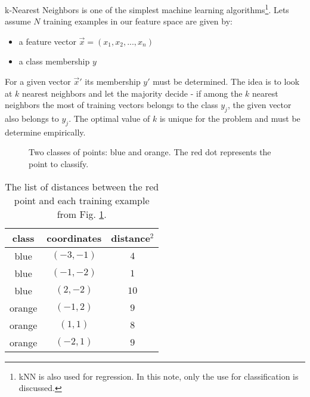 k-Nearest Neighbors is one of the simplest machine learning algorithms\footnote{kNN is also used for regression. In this note, only the use for classification is discussed.}. Lets assume $N$ training examples in our feature space are given by:

\begin{itemize}
  \item a feature vector $\vec x = (x_1, x_2, ... , x_n)$
  \item a class membership $y$
\end{itemize}

For a given vector $\vec x'$ its membership $y'$ must be determined. The idea is to look at $k$ nearest neighbors and let the majority decide - if among the $k$ nearest neighbors the most of training vectors belongs to the class $y_j$, the given vector also belongs to $y_j$. The optimal value of $k$ is unique for the problem and must be determine empirically. 

\begin{figure}

  \centering
  \caption{Two classes of points: blue and orange. The red dot represents the point to classify.}
  \label{fig: knnExample}
  
\end{figure}

\begin{table}
\begin{center}
\begin{tabular}{c | c | c}

class & coordinates & distance$^2$ \\ \hline
\color{mblue}blue     & $(-3,-1)$ & $4$  \\
\color{mblue}blue     & $(-1,-2)$ & $1$  \\
\color{mblue}blue     & $(2,-2)$  & $10$ \\ \hline
\color{morange}orange & $(-1,2)$  & $9$  \\
\color{morange}orange & $(1,1)$   & $8$  \\
\color{morange}orange & $(-2,1)$  & $9$  \\

\end{tabular}
\end{center}

\caption{The list of distances between the red point and each training example from Fig. \ref{fig: knnExample}.}
\label{tab: knnExDist}

\end{table}

